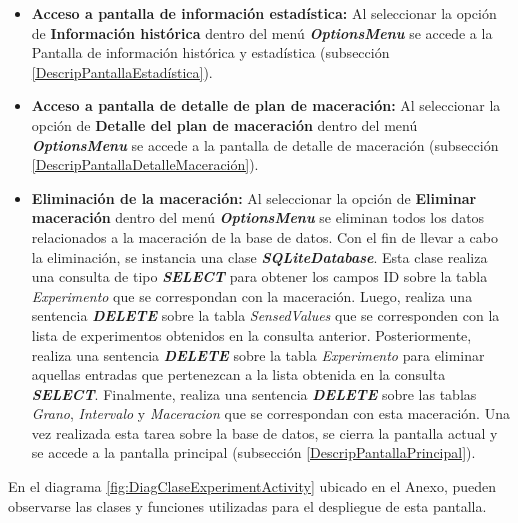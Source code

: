\begin{itemize}
                    \item \textbf{Acceso a pantalla de información estadística:} Al seleccionar la opción de \textbf{Información histórica} dentro del menú \textbf{\textit{\gls{OptionsMenu}}} se accede a la Pantalla de información histórica y estadística (subsección \ref{DescripPantallaEstadística}).
                    
                    \item \textbf{Acceso a pantalla de detalle de plan de maceración:} Al seleccionar la opción de \textbf{Detalle del plan de maceración} dentro del menú \textbf{\textit{\gls{OptionsMenu}}} se accede a la pantalla de detalle de maceración (subsección \ref{DescripPantallaDetalleMaceración}).
                    
                    \item \textbf{Eliminación de la maceración:} Al seleccionar la opción de \textbf{Eliminar maceración} dentro del menú \textbf{\textit{\gls{OptionsMenu}}} se eliminan todos los datos relacionados a la maceración de la base de datos. Con el fin de llevar a cabo la eliminación, se instancia una clase \textbf{\textit{\gls{SQLiteDatabase}}}. 
                    Esta clase realiza una consulta de tipo \textbf{\textit{\gls{SELECT}}} para obtener los campos ID sobre la tabla \textit{Experimento} que se correspondan con la maceración. Luego, realiza una sentencia \textbf{\textit{\gls{DELETE}}} sobre la tabla \textit{SensedValues} que se corresponden con la lista de experimentos obtenidos en la consulta anterior. Posteriormente, realiza una sentencia \textbf{\textit{\gls{DELETE}}} sobre la tabla \textit{Experimento} para eliminar aquellas entradas que pertenezcan a la lista obtenida en la consulta \textbf{\textit{\gls{SELECT}}}. Finalmente, realiza una sentencia \textbf{\textit{\gls{DELETE}}} sobre las tablas \textit{Grano}, \textit{Intervalo} y \textit{Maceracion} que se correspondan con esta maceración.
                    Una vez realizada esta tarea sobre la base de datos, se cierra la pantalla actual y se accede a la pantalla principal (subsección \ref{DescripPantallaPrincipal}).
                   
                \end{itemize}
                
                
                \par En el diagrama \ref{fig:DiagClaseExperimentActivity} ubicado en el Anexo, pueden observarse las clases y funciones utilizadas para el despliegue de esta pantalla.
            
